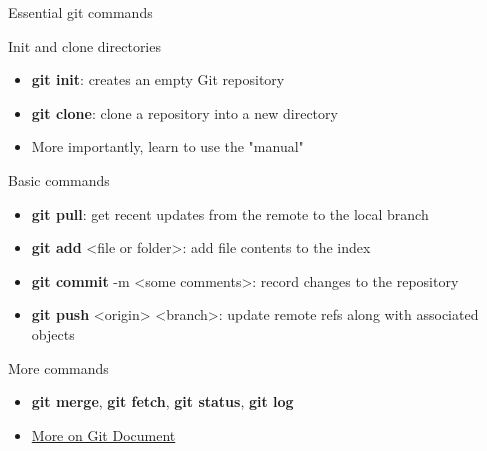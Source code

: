 \documentclass[10pt]{beamer}
\begin{document}
\begin{frame}{Essential git commands} 
\begin{block}{Init and clone directories}
\begin{itemize}
	\item \textbf{git init}: creates an empty Git repository 
	\item \textbf{git clone}: clone a repository into a new directory
	\item More importantly, learn to use the "manual"
\end{itemize}
\end{block}
\begin{block}{Basic commands}
\begin{itemize}
	\item \textbf{git pull}: get recent updates from the remote to the local branch
	\item \textbf{git add } <file or folder>: add file contents to the index
	\item \textbf{git commit }-m <some comments>: record changes to the repository
	\item \textbf{git push} <origin> <branch>: update remote refs along with associated objects
\end{itemize}
\end{block}
\begin{block}{More commands}
\begin{itemize}
	\item \textbf{git merge},  \textbf{git fetch}, \textbf{git status}, \textbf{git log}
	\item  \href{https://git-scm.com/docs}{More on Git Document}
\end{itemize}
\end{block}
\end{frame}
\end{document}
